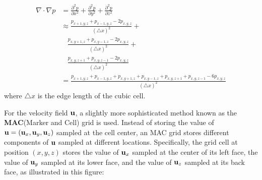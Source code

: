 \begin{equation}
    \begin{aligned}
        \nabla \cdot \nabla p 
        &= 
        \frac{\partial ^2 p}{\partial x^2}+
        \frac{\partial ^2 p}{\partial y^2}+
        \frac{\partial ^2 p}{\partial z^2} \\
        &\approx 
        \frac{p_{x+1,y,z}+p_{x-1,y,z}-2p_{x,y,z}}{(\triangle x)^2}+ \\
        &~~~~\frac{p_{x,y+1,z}+p_{x,y-1,z}-2p_{x,y,z}}{(\triangle x)^2}+ \\
        &~~~~\frac{p_{x,y,z+1}+p_{x,y,z-1}-2p_{x,y,z}}{(\triangle x)^2}\\
        &= \frac{p_{x+1,y,z}+p_{x-1,y,z}+p_{x,y+1,z}+p_{x,y-1,z}+p_{x,y,z+1}+p_{x,y,z-1}-6p_{x,y,z}}{(\triangle x)^2}
    \end{aligned}
    \label{eqn discrete laplacian pressure}
\end{equation}
where $\triangle x$ is the edge length of the cubic cell. 


For the velocity field $\textbf{u}$, a slightly more sophisticated method known as the \textbf{MAC}(Marker and Cell) grid is used. Instead of storing the value of $\textbf{u} = (\textbf{u}_x,\textbf{u}_y,\textbf{u}_z)$ sampled at the cell center, an MAC grid stores different components of $\textbf{u}$ sampled at different locations. Specifically, the grid cell at position $(x,y,z)$ stores the value of $\textbf{u}_x$ sampled at the center of its left face, the value of $\textbf{u}_y$ sampled at its lower face, and the value of $\textbf{u}_z$ sampled at its back face, as illustrated in this figure:

